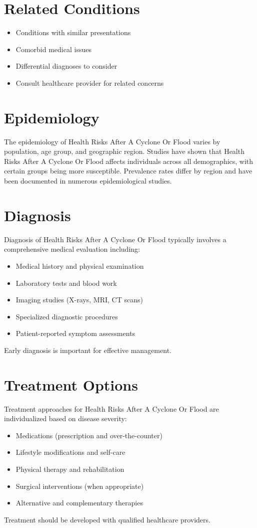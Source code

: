 \section*{Related Conditions}
\begin{itemize}
  \item Conditions with similar presentations
  \item Comorbid medical issues
  \item Differential diagnoses to consider
  \item Consult healthcare provider for related concerns
\end{itemize}

\section*{Epidemiology}
The epidemiology of Health Risks After A Cyclone Or Flood varies by population, age group, and geographic region. Studies have shown that Health Risks After A Cyclone Or Flood affects individuals across all demographics, with certain groups being more susceptible. Prevalence rates differ by region and have been documented in numerous epidemiological studies.

\section*{Diagnosis}
Diagnosis of Health Risks After A Cyclone Or Flood typically involves a comprehensive medical evaluation including:
\begin{itemize}
  \item Medical history and physical examination
  \item Laboratory tests and blood work
  \item Imaging studies (X-rays, MRI, CT scans)
  \item Specialized diagnostic procedures
  \item Patient-reported symptom assessments
\end{itemize}
Early diagnosis is important for effective management.

\section*{Treatment Options}
Treatment approaches for Health Risks After A Cyclone Or Flood are individualized based on disease severity:
\begin{itemize}
  \item Medications (prescription and over-the-counter)
  \item Lifestyle modifications and self-care
  \item Physical therapy and rehabilitation
  \item Surgical interventions (when appropriate)
  \item Alternative and complementary therapies
\end{itemize}
Treatment should be developed with qualified healthcare providers.

